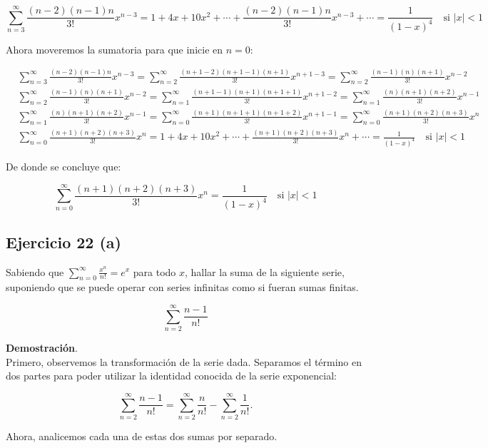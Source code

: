 \documentclass{article}
\begin{document}
    $$
    \sum_{n=3}^{\infty} \frac{(n-2)(n-1) n}{3!} x^{n-3}=1+4 x+10 x^{2}+\cdots+\frac{(n-2)(n-1) n}{3!} x^{n-3}+\cdots=\frac{1}{(1-x)^{4}} \quad \text {si } |x|<1
    $$

    Ahora moveremos la sumatoria para que inicie en $n=0$:

    $$
    \begin{aligned}
    & \sum_{n=3}^{\infty} \frac{(n-2)(n-1) n}{3!} x^{n-3}=\sum_{n=2}^{\infty} \frac{(n+1-2)(n+1-1)(n+1)}{3!} x^{n+1-3}=\sum_{n=2}^{\infty} \frac{(n-1)(n)(n+1)}{3!} x^{n-2} \\
    & \sum_{n=2}^{\infty} \frac{(n-1)(n)(n+1)}{3!} x^{n-2}=\sum_{n=1}^{\infty} \frac{(n+1-1)(n+1)(n+1+1)}{3!} x^{n+1-2}=\sum_{n=1}^{\infty} \frac{(n)(n+1)(n+2)}{3!} x^{n-1} \\
    & \sum_{n=1}^{\infty} \frac{(n)(n+1)(n+2)}{3!} x^{n-1}=\sum_{n=0}^{\infty} \frac{(n+1)(n+1+1)(n+1+2)}{3!} x^{n+1-1}=\sum_{n=0}^{\infty} \frac{(n+1)(n+2)(n+3)}{3!} x^{n} \\
    & \sum_{n=0}^{\infty} \frac{(n+1)(n+2)(n+3)}{3!} x^{n}=1+4 x+10 x^{2}+\cdots+\frac{(n+1)(n+2)(n+3)}{3!} x^{n}+\cdots=\frac{1}{(1-x)^{4}} \quad \text {si } |x|<1
    \end{aligned}
    $$

    De donde se concluye que:

    $$
    \sum_{n=0}^{\infty} \frac{(n+1)(n+2)(n+3)}{3!} x^{n}=\frac{1}{(1-x)^{4}} \quad \text {si } |x|<1
    $$

    \subsection*{Ejercicio 22 (a)}

    Sabiendo que $\sum_{n=0}^{\infty} \frac{x^{n}}{n!}=e^{x}$ para todo $x$, hallar la suma de la siguiente serie, suponiendo que se puede operar con series infinitas como si fueran sumas finitas.

    $$
    \sum_{n=2}^{\infty} \frac{n-1}{n!}
    $$

    \textbf{Demostración}.\\

    Primero, observemos la transformación de la serie dada. Separamos el término en dos partes para poder utilizar la identidad conocida de la serie exponencial:

    $$
    \sum_{n=2}^{\infty} \frac{n-1}{n!} = \sum_{n=2}^{\infty} \frac{n}{n!} - \sum_{n=2}^{\infty} \frac{1}{n!}.
    $$

    Ahora, analicemos cada una de estas dos sumas por separado.
\end{document}
